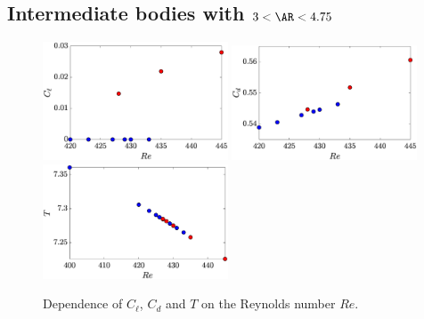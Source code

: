 \documentclass{jfm}
\begin{document}
\subsection{Intermediate bodies with $3 < \AR < 4.75$}


\begin{figure}
  \centering
  \includegraphics[width=0.49\textwidth]{./fig/AR4_Cl_Re.eps}
  \includegraphics[width=0.49\textwidth]{./fig/AR4_Cd_Re.eps}
  \includegraphics[width=0.49\textwidth]{./fig/AR4_T_Re.eps}
  \caption{Dependence of $C_\ell$, $C_d$ and $T$ on the Reynolds number $Re$.}
  \label{fig:Cl-Cd-AR4}
\end{figure}
\end{document}
